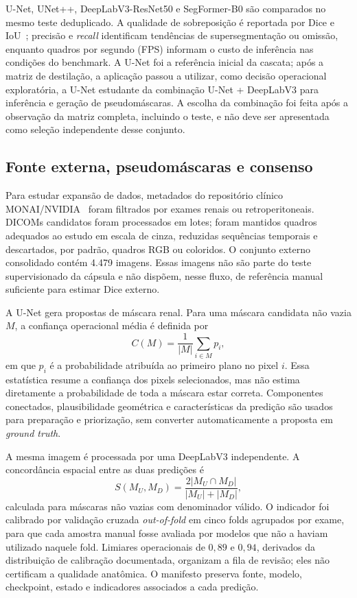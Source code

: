 \documentclass[12pt]{article}
\begin{document}
U-Net, UNet++, DeepLabV3-ResNet50 e SegFormer-B0 são comparados no mesmo teste deduplicado. A qualidade de sobreposição é reportada por Dice e IoU~\cite{Taha2015Metrics}; precisão e \textit{recall} identificam tendências de supersegmentação ou omissão, enquanto quadros por segundo (FPS) informam o custo de inferência nas condições do benchmark. A U-Net foi a referência inicial da cascata; após a matriz de destilação, a aplicação passou a utilizar, como decisão operacional exploratória, a U-Net estudante da combinação U-Net + DeepLabV3 para inferência e geração de pseudomáscaras. A escolha da combinação foi feita após a observação da matriz completa, incluindo o teste, e não deve ser apresentada como seleção independente desse conjunto.

\subsection{Fonte externa, pseudomáscaras e consenso}

Para estudar expansão de dados, metadados do repositório clínico MONAI/NVIDIA~\cite{MONAIClinicalUltrasound} foram filtrados por exames renais ou retroperitoneais. DICOMs candidatos foram processados em lotes; foram mantidos quadros adequados ao estudo em escala de cinza, reduzidas sequências temporais e descartados, por padrão, quadros RGB ou coloridos. O conjunto externo consolidado contém 4.479 imagens. Essas imagens não são parte do teste supervisionado da cápsula e não dispõem, nesse fluxo, de referência manual suficiente para estimar Dice externo.

A U-Net gera propostas de máscara renal. Para uma máscara candidata não vazia $M$, a confiança operacional média é definida por
\begin{equation}
 C(M)=\frac{1}{|M|}\sum_{i\in M}p_i,
 \label{eq:confidence}
\end{equation}
em que $p_i$ é a probabilidade atribuída ao primeiro plano no pixel $i$. Essa estatística resume a confiança dos pixels selecionados, mas não estima diretamente a probabilidade de toda a máscara estar correta. Componentes conectados, plausibilidade geométrica e características da predição são usados para preparação e priorização, sem converter automaticamente a proposta em \textit{ground truth}.

A mesma imagem é processada por uma DeepLabV3 independente. A concordância espacial entre as duas predições é
\begin{equation}
 S(M_U,M_D)=\frac{2|M_U\cap M_D|}{|M_U|+|M_D|},
 \label{eq:consensus}
\end{equation}
calculada para máscaras não vazias com denominador válido. O indicador foi calibrado por validação cruzada \textit{out-of-fold} em cinco folds agrupados por exame, para que cada amostra manual fosse avaliada por modelos que não a haviam utilizado naquele fold. Limiares operacionais de $0{,}89$ e $0{,}94$, derivados da distribuição de calibração documentada, organizam a fila de revisão; eles não certificam a qualidade anatômica. O manifesto preserva fonte, modelo, checkpoint, estado e indicadores associados a cada predição.
\end{document}
